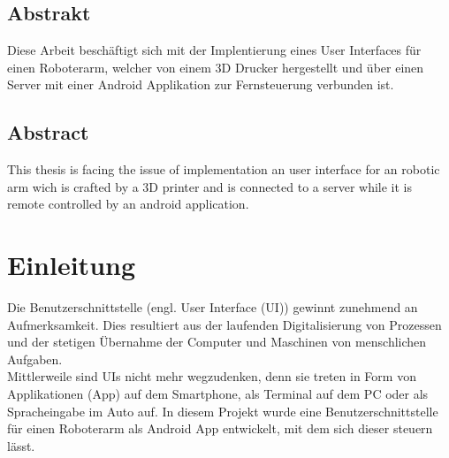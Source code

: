 \documentclass[12pt,					%
							 oneside,			%
							 a4paper,			%
							 halfparskip,		%
							 liststotoc,			%
							 bibtotoc,			%
							 fleqn,				%
							 pointlessnumbers]	%
							 {scrreprt}
\begin{document}
\begin{titlepage}
\begin{center}
\begin{table}[b]
\begin{tabular}{rl}
				\end{tabular}
			\end{table}
		\end{center}
	\end{titlepage}

	\onehalfspacing 					%
	

	
\section*{Abstrakt}
Diese Arbeit beschäftigt sich mit der Implentierung eines User Interfaces für einen Roboterarm, welcher von einem 3D Drucker hergestellt und über einen Server mit einer Android Applikation zur Fernsteuerung verbunden ist.
\section*{Abstract}
This thesis is facing the issue of implementation an user interface for an robotic arm wich is crafted by a 3D printer and is connected to a server while it is remote controlled by an android application.
\tableofcontents
{} 					%

\chapter{Einleitung}
Die Benutzerschnittstelle (engl. User Interface (UI)) gewinnt zunehmend an Aufmerksamkeit. Dies resultiert aus der laufenden Digitalisierung von Prozessen und der stetigen Übernahme der Computer und Maschinen von menschlichen Aufgaben. \\
Mittlerweile sind UIs nicht mehr wegzudenken, denn sie treten in Form von Applikationen (App) auf dem Smartphone, als Terminal auf dem PC oder als Spracheingabe im Auto auf.
In diesem Projekt wurde eine Benutzerschnittstelle für einen Roboterarm als Android App entwickelt, mit dem sich dieser steuern lässt. 
\end{document}
